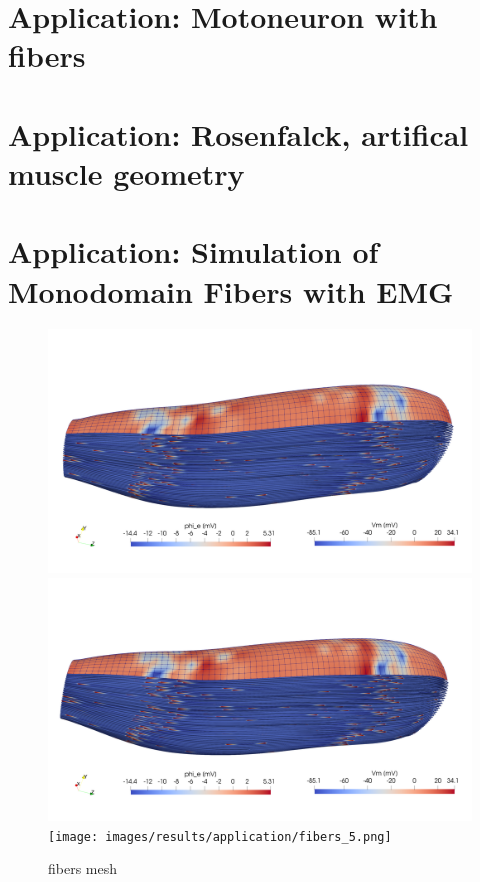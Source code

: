 \section{Application: Motoneuron with fibers}
\section{Application: Rosenfalck, artifical muscle geometry}
\section{Application: Simulation of Monodomain Fibers with EMG}

\begin{figure}[H]
  \centering%
  \includegraphics[width=\textwidth]{images/results/application/fibers_3.png}%
  \includegraphics[width=\textwidth]{images/results/application/fibers_4.png}%
  \texttt{[image: images/results/application/fibers\_5.png]}%
  \caption{fibers mesh}%
  \label{fig:multidomain_mesh}%
\end{figure}


